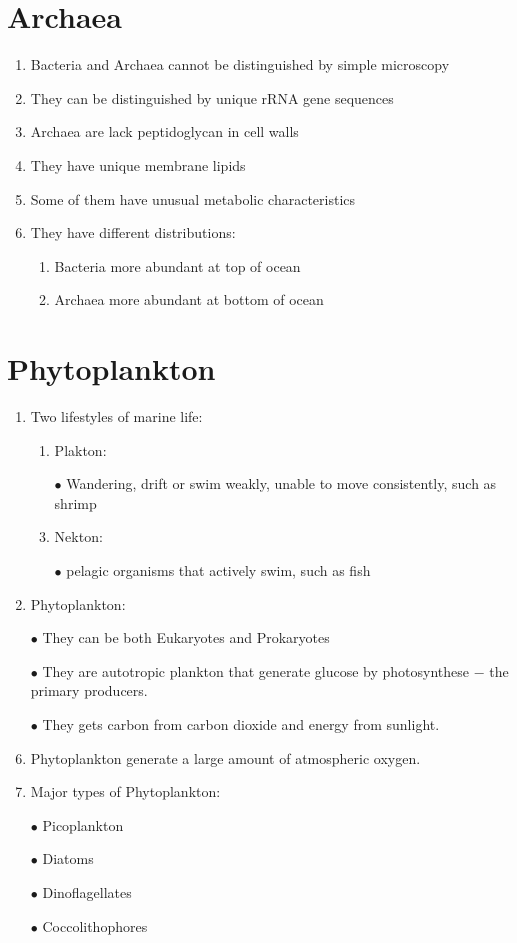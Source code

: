 \documentclass{report}
\begin{document}
\section{Archaea}
\begin{enumerate}
    \item Bacteria and Archaea cannot be distinguished by simple microscopy
    \item They can be distinguished by unique rRNA gene sequences
    \item Archaea are lack peptidoglycan in cell walls
    \item They have unique membrane lipids
    \item Some of them have unusual metabolic characteristics
    \item They have different distributions:
    \begin{enumerate}
        \item Bacteria more abundant at top of ocean
        \item Archaea more abundant at bottom of ocean
    \end{enumerate}
\end{enumerate}


\section{Phytoplankton}
\begin{enumerate}
    \item Two lifestyles of marine life:
    \begin{enumerate}
        \item Plakton:
        \item [$\bullet$]Wandering, drift or swim weakly, unable to move consistently, such as shrimp
        \item Nekton:
        \item [$\bullet$]pelagic organisms that actively swim, such as fish
    \end{enumerate}
    \item Phytoplankton:
    \item [$\bullet$]They can be both Eukaryotes and Prokaryotes
    \item [$\bullet$]They are autotropic plankton that generate glucose by photosynthese $-$ the primary producers.
    \item [$\bullet$]They gets carbon from carbon dioxide and energy from sunlight.
    \item Phytoplankton generate a large amount of atmospheric oxygen.
    \item Major types of Phytoplankton:
    \item [$\bullet$]Picoplankton
    \item [$\bullet$]Diatoms
    \item [$\bullet$]Dinoflagellates
    \item [$\bullet$]Coccolithophores
\end{enumerate}
\end{document}
